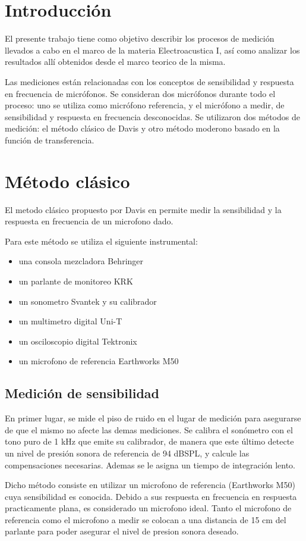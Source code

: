 \documentclass[]{article}
\begin{document}
\begin{multicols}{2}
\section{Introducción}
El presente trabajo tiene como objetivo describir los procesos de medición
llevados a cabo en el marco de la materia Electroacustica I, así como analizar
los resultados allí obtenidos desde el marco teorico de la misma.

Las mediciones están relacionadas con los conceptos de sensibilidad y respuesta
 en frecuencia de micrófonos. Se consideran dos micrófonos durante todo el
proceso: uno se utiliza como micrófono referencia, y el micrófono a medir, de
sensibilidad y respuesta en frecuencia desconocidas. Se utilizaron dos métodos
de medición: el método clásico de Davis y otro método moderono basado en la
función de transferencia.
\section{Método clásico}
El metodo clásico propuesto por Davis en \cite{davis2006sound} permite medir
la sensibilidad y la respuesta en frecuencia de un microfono dado.

Para este método se utiliza el siguiente instrumental:
\begin{itemize}
\item una consola mezcladora Behringer
\item un parlante de monitoreo KRK
\item un sonometro Svantek y su calibrador
\item un multimetro digital Uni-T
\item un osciloscopio digital Tektronix
\item un microfono de referencia Earthworks M50
\end{itemize}

\subsection{Medición de sensibilidad}
En primer lugar, se mide el piso de ruido en el lugar de medición para asegurarse
de que el mismo no afecte las demas mediciones. Se calibra el sonómetro con el
tono puro de 1 kHz que emite su calibrador, de manera que este último detecte un
nivel de presión sonora de referencia de 94 dBSPL, y calcule las compensaciones
necesarias. Ademas se le asigna un tiempo de integración lento.

Dicho método consiste en utilizar un microfono de referencia (Earthworks M50)
cuya sensibilidad es conocida. Debido a sus respuesta en frecuencia en respuesta
practicamente plana, es considerado un microfono ideal. Tanto el microfono de
referencia como el microfono a medir se colocan a una distancia de 15 cm del
parlante para poder asegurar el nivel de presion sonora deseado.


\end{multicols}
\end{document}
